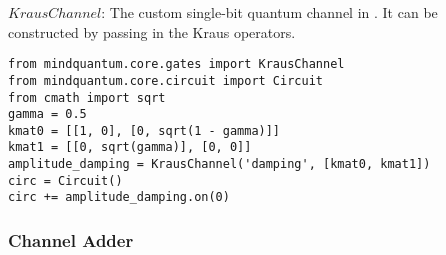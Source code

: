 $Kraus Channel$: The custom single-bit quantum channel in \MindQuantum. It can be constructed by passing in the Kraus operators.
\begin{lstlisting}
from mindquantum.core.gates import KrausChannel
from mindquantum.core.circuit import Circuit
from cmath import sqrt
gamma = 0.5
kmat0 = [[1, 0], [0, sqrt(1 - gamma)]]
kmat1 = [[0, sqrt(gamma)], [0, 0]]
amplitude_damping = KrausChannel('damping', [kmat0, kmat1])
circ = Circuit()
circ += amplitude_damping.on(0)
\end{lstlisting}

\subsubsection{Channel Adder}
